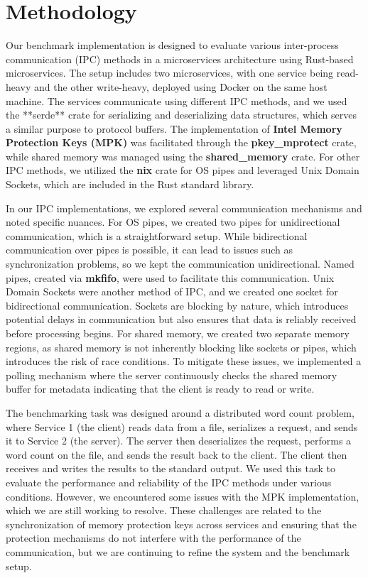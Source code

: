 \documentclass[letterpaper,twocolumn,10pt]{article}
\begin{document}
\section{Methodology}
Our benchmark implementation is designed to evaluate various inter-process communication (IPC) methods in a microservices architecture using Rust-based microservices.
The setup includes two microservices, with one service being read-heavy and the other write-heavy, deployed using Docker on the same host machine.
The services communicate using different IPC methods, and we used the **serde** crate for serializing and deserializing data structures, which serves a similar purpose to protocol buffers.
The implementation of \textbf{Intel Memory Protection Keys (MPK)} was facilitated through the \textbf{pkey\_mprotect} crate, while shared memory was managed using the \textbf{shared\_memory} crate.
For other IPC methods, we utilized the \textbf{nix} crate for OS pipes and leveraged Unix Domain Sockets, which are included in the Rust standard library.

In our IPC implementations, we explored several communication mechanisms and noted specific nuances.
For OS pipes, we created two pipes for unidirectional communication, which is a straightforward setup.
While bidirectional communication over pipes is possible, it can lead to issues such as synchronization problems, so we kept the communication unidirectional.
Named pipes, created via \textbf{mkfifo}, were used to facilitate this communication.
Unix Domain Sockets were another method of IPC, and we created one socket for bidirectional communication.
Sockets are blocking by nature, which introduces potential delays in communication but also ensures that data is reliably received before processing begins.
For shared memory, we created two separate memory regions, as shared memory is not inherently blocking like sockets or pipes, which introduces the risk of race conditions.
To mitigate these issues, we implemented a polling mechanism where the server continuously checks the shared memory buffer for metadata indicating that the client is ready to read or write.

The benchmarking task was designed around a distributed word count problem, where Service 1 (the client) reads data from a file, serializes a request, and sends it to Service 2 (the server).
The server then deserializes the request, performs a word count on the file, and sends the result back to the client.
The client then receives and writes the results to the standard output.
We used this task to evaluate the performance and reliability of the IPC methods under various conditions.
However, we encountered some issues with the MPK implementation, which we are still working to resolve.
These challenges are related to the synchronization of memory protection keys across services and ensuring that the protection mechanisms do not interfere with the performance of the communication, but we are continuing to refine the system and the benchmark setup.
\end{document}
